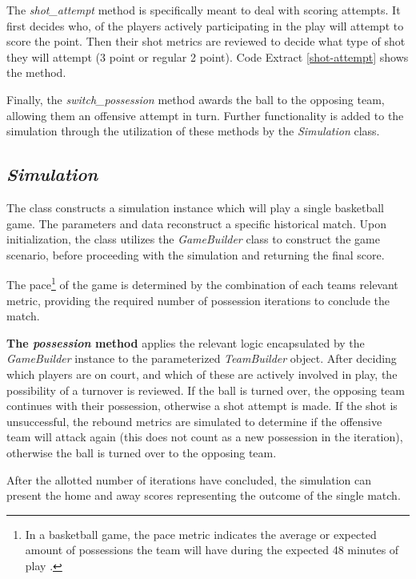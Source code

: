 \documentclass{thesis-ekf}
\theoremstyle{definition}
\theoremstyle{remark}
\begin{document}
The \emph{shot\_attempt} method is specifically meant to deal with scoring attempts. It first decides who, of the players actively participating in the play will attempt to score the point. Then their shot metrics are reviewed to decide what type of shot they will attempt (3 point or regular 2 point). Code Extract \ref{shot-attempt} shows the method.


Finally, the \emph{switch\_possession} method awards the ball to the opposing team, allowing them an offensive attempt in turn. Further functionality is added to the simulation through the utilization of these methods by the \emph{Simulation} class.


\subsection{\emph{Simulation}}
The class constructs a simulation instance which will play a single basketball game. The parameters and data reconstruct a specific historical match. Upon initialization, the class utilizes the \emph{GameBuilder} class to construct the game scenario, before proceeding with the simulation and returning the final score.

The pace\footnote{In a basketball game, the pace metric indicates the average or expected amount of possessions the team will have during the expected 48 minutes of play \cite{pace}.} of the game is determined by the combination of each teams relevant metric, providing the required number of possession iterations to conclude the match.

\textbf{The \emph{possession} method} applies the relevant logic encapsulated by the \emph{GameBuilder} instance to the parameterized \emph{TeamBuilder} object. After deciding which players are on court, and which of these are actively involved in play, the possibility of a turnover is reviewed. If the ball is turned over, the opposing team continues with their possession, otherwise a shot attempt is made. If the shot is unsuccessful, the rebound metrics are simulated to determine if the offensive team will attack again (this does not count as a new possession in the iteration), otherwise the ball is turned over to the opposing team. 

After the allotted number of iterations have concluded, the simulation can present the home and away scores representing the outcome of the single match.
\end{document}

